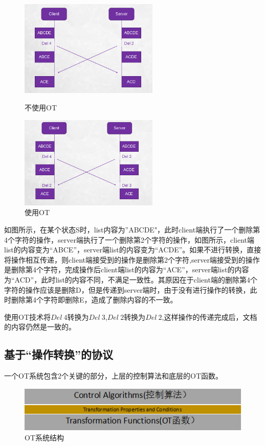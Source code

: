 \begin{figure}[H]
\begin{minipage}[t]{0.5\linewidth}
\centering
\includegraphics[width=2.6in]{figures/exm1.bmp}
\caption{不使用OT}
\label{fig:side:a}
\end{minipage}%
\begin{minipage}[t]{0.5\linewidth}
\centering
\includegraphics[width=2.6in]{figures/exm2.bmp}
\caption{使用OT}
\label{fig:side:b}
\end{minipage}
\end{figure}

如图所示，在某个状态S时，list内容为”ABCDE"，此时client端执行了一个删除第4个字符的操作，server端执行了一个删除第2个字符的操作，如图所示，client端list的内容变为“ABCE”，server端list的内容变为“ACDE”。如果不进行转换，直接将操作相互传递，则client端接受到的操作是删除第2个字符,server端接受到的操作是删除第4个字符，完成操作后client端list的内容为“ACE”，server端list的内容为“ACD”，此时list的内容不同，不满足一致性。其原因在于client端的删除第4个字符的操作应该是删除D，但是传递到server端时，由于没有进行操作的转换，此时删除第4个字符即删除E，造成了删除内容的不一致。

使用OT技术将$Del\ 4$转换为$Del\ 3$,$Del\ 2$转换为$Del\ 2$,这样操作的传递完成后，文档的内容仍然是一致的。

\subsection{基于``操作转换''的协议}
一个OT系统包含2个关键的部分，上层的控制算法和底层的OT函数。
\begin{figure}[H]
\centering
\includegraphics{figures/structure.bmp}
\caption{OT系统结构}
\end{figure}


